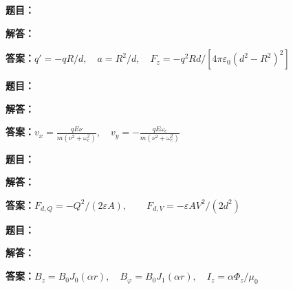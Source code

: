 \documentclass[lang=cn,color=blue,11pt]{elegantbook}
\begin{document}
\par
\noindent\textbf{题目：}
\par\noindent\textbf{解答：}
\par\noindent\textbf{答案：}\(\displaystyle q'=-qR/d,\quad a=R^2/d,\quad F_z=-q^2Rd/[4\pi\varepsilon_0(d^2-R^2)^2]\)\par
\par\smallskip\noindent\hrulefill\par\medskip
{}\par
\noindent\textbf{题目：}
\par\noindent\textbf{解答：}
\par\noindent\textbf{答案：}\(\displaystyle v_x=\frac{qE\nu}{m(\nu^2+\omega_c^2)},\quad v_y=-\frac{qE\omega_c}{m(\nu^2+\omega_c^2)}\)\par
\par\smallskip\noindent\hrulefill\par\medskip
{}\par
\noindent\textbf{题目：}
\par\noindent\textbf{解答：}
\par\noindent\textbf{答案：}\(\displaystyle F_{d,Q}=-Q^2/(2\varepsilon A),\qquad F_{d,V}=-\varepsilon AV^2/(2d^2)\)\par
\par\smallskip\noindent\hrulefill\par\medskip
{}\par
\noindent\textbf{题目：}
\par\noindent\textbf{解答：}
\par\noindent\textbf{答案：}\(\displaystyle B_z=B_0J_0(\alpha r),\quad B_\varphi=B_0J_1(\alpha r),\quad I_z=\alpha\Phi_z/\mu_0\)\par
\par\smallskip\noindent\hrulefill\par\medskip
\end{document}
